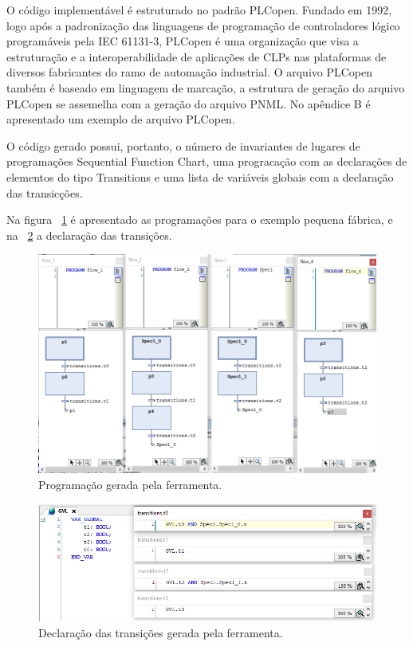 O c\'odigo implement\'avel \'e estruturado no padr\~ao PLCopen. Fundado em 1992, logo ap\'os a padroniza\c{c}\~ao das linguagens de programa\c{c}\~ao de controladores l\'ogico program\'aveis pela IEC 61131-3, PLCopen \'e uma organiza\c{c}\~ao que visa a estrutura\c{c}\~ao e a interoperabilidade de aplica\c{c}\~oes de CLPs nas plataformas de diversos fabricantes do ramo de automa\c{c}\~ao industrial. O arquivo PLCopen tamb\'em \'e baseado em linguagem de marca\c{c}\~ao, a estrutura de gera\c{c}\~ao do arquivo PLCopen se assemelha com a gera\c{c}\~ao do arquivo PNML. No ap\^endice B \'e apresentado um exemplo de arquivo PLCopen.

O c\'odigo gerado possui, portanto, o n\'umero de invariantes de lugares de programa\c{c}\~oes Sequential Function Chart, uma prograca\c{c}\~ao com as declara\c{c}\~oes de elementos do tipo Transitions e uma lista de vari\'aveis globais com a declara\c{c}\~ao das transic\c{c}\~oes.

Na figura ~\ref{fig:pqnafabricasfcs} \'e apresentado as programa\c{c}\~oes para o exemplo pequena f\'abrica, e na ~\ref{fig:pqnafabricagvl} a declara\c{c}\~ao das transi\c{c}\~oes.

\begin{figure}[!htb]
	\caption[Programa\c{c}\~ao gerada pela ferramenta.]{Programa\c{c}\~ao gerada pela ferramenta.}
	\label{fig:pqnafabricasfcs}
	\includegraphics[width=16cm]{./figuras/PQNAFABSFCS.png}\centering
\end{figure}

\begin{figure}[!htb]
	\caption[Declara\c{c}\~ao das transi\c{c}\~oes gerada pela ferramenta.]{Declara\c{c}\~ao das transi\c{c}\~oes gerada pela ferramenta.}
	\label{fig:pqnafabricagvl}
	\includegraphics[width=16cm]{./figuras/PQNAFABGVL.png}\centering
\end{figure}
